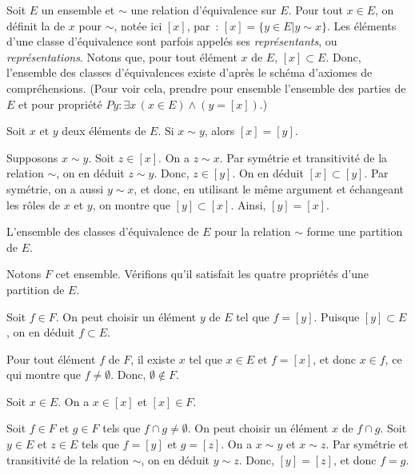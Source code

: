 Soit $E$ un ensemble et $\sim$ une relation d'équivalence sur $E$. 
Pour tout $x \in E$, on définit la \emph{} de $x$ pour $\sim$, notée ici $[x]$, par : $[x] = \lbrace y \in E \vert y \sim x \rbrace$. 
Les éléments d'une classe d'équivalence sont parfois appelés ses \emph{représentants}, ou \emph{représentations}. 
Notons que, pour tout élément $x$ de $E$, $[x] \subset E$. 
Donc, l'ensemble des classes d'équivalences existe d'après le schéma d'axiomes de compréhensions. 
(Pour voir cela, prendre pour ensemble l'ensemble des parties de $E$ et pour propriété $P y: \exists x \, (x \in E) \wedge (y = [x])$.)

\blank[medium]

\noindent {} Soit $x$ et $y$ deux éléments de $E$. Si $x \sim y$, alors $[x] = [y]$. 

\blank[medium]

\noindent {} 
    Supposons $x \sim y$. Soit $z \in [x]$. On a $z \sim x$. Par symétrie et transitivité de la relation $\sim$, on en déduit $z \sim y$. Donc, $z \in [y]$. 
    On en déduit $[x] \subset [y]$.
    Par symétrie, on a aussi $y \sim x$, et donc, en utilisant le même argument et échangeant les rôles de $x$ et $y$, on montre que $[y] \subset [x]$. 
    Ainsi, $[y] = [x]$.

\done

\blank[medium]

\noindent {} L'ensemble des classes d'équivalence de $E$ pour la relation $\sim$ forme une partition de $E$.

\blank[medium]

\noindent {} 
Notons $F$ cet ensemble. 
Vérifions qu'il satisfait les quatre propriétés d'une partition de $E$.
\startitemize
    \item Soit $f \in F$. On peut choisir un élément $y$ de $E$ tel que $f = [y]$. Puisque $[y] \subset E$, on en déduit $f \subset E$.
    \item Pour tout élément $f$ de $F$, il existe $x$ tel que $x \in E$ et $f = [x]$, et donc $x \in f$, ce qui montre que $f \neq \emptyset$. 
        Donc, $\emptyset \notin F$. 
    \item Soit $x \in E$. On a $x \in [x]$ et $[x] \in F$. 
    \item Soit $f \in F$ et $g \in F$ tels que $f \cap g \neq \emptyset$. 
        On peut choisir un élément $x$ de $f \cap g$. 
        Soit $y \in E$ et $z \in E$ tels que $f = [y]$ et $g = [z]$. 
        On a $x \sim y$ et $x \sim z$. 
        Par symétrie et transitivité de la relation $\sim$, on en déduit $y \sim z$. 
        Donc, $[y] = [z]$, et donc $f = g$.
\stopitemize

